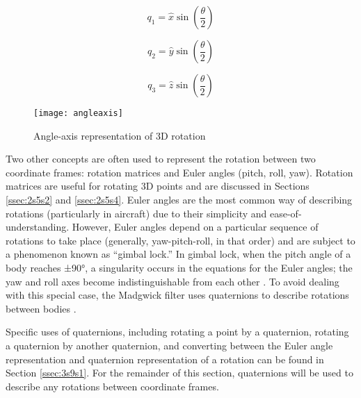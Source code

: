 \documentclass[12pt,a4paper]{report}
\begin{document}
\begin{equation} \label{eq:q1}
	q_1 = \hat{x} \sin\left(\frac{\theta}{2}\right)
\end{equation}

\begin{equation} \label{eq:q2}
	q_2 = \hat{y} \sin\left(\frac{\theta}{2}\right)
\end{equation}

\begin{equation} \label{eq:q3}
	q_3 = \hat{z} \sin\left(\frac{\theta}{2}\right)
\end{equation}

\begin{figure}[htbp]
	\centering
	\texttt{[image: angleaxis]}
	\caption{Angle-axis representation of 3D rotation \cite{quaternionuse}}
	\label{fig:angleaxis}
\end{figure}

Two other concepts are often used to represent the rotation between two coordinate frames: rotation matrices and Euler angles (pitch, roll, yaw). Rotation matrices are useful for rotating 3D points and are discussed in Sections \ref{ssec:2s5s2} and \ref{ssec:2s5s4}. Euler angles are the most common way of describing rotations (particularly in aircraft) due to their simplicity and ease-of-understanding. However, Euler angles depend on a particular sequence of rotations to take place (generally, yaw-pitch-roll, in that order) and are subject to a phenomenon known as “gimbal lock.” In gimbal lock, when the pitch angle of a body reaches ±90°, a singularity occurs in the equations for the Euler angles; the yaw and roll axes become indistinguishable from each other \cite{quaternionuse}. To avoid dealing with this special case, the Madgwick filter uses quaternions to describe rotations between bodies \cite{madgwick}.

Specific uses of quaternions, including rotating a point by a quaternion, rotating a quaternion by another quaternion, and converting between the Euler angle representation and quaternion representation of a rotation can be found in Section \ref{ssec:3s9s1}. For the remainder of this section, quaternions will be used to describe any rotations between coordinate frames.
\end{document}
